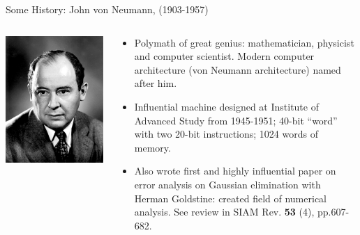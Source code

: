 \documentclass[aspectratio=169]{beamer}
\newcommand{\mypause}{\pause}
\newcommand{\cramplist}{
	\setlength{\itemsep}{0in}
	\setlength{\partopsep}{0in}
	\setlength{\topsep}{0in}}
\begin{document}
\begin{frame}{Some History: John von Neumann, (1903-1957)}
  \begin{columns}
    
    \begin{column}{0.4\linewidth}
      \includegraphics[width=\linewidth]{JohnvonNeumann-LosAlamos.png}
    \end{column}

    \begin{column}{0.6\linewidth}
      \begin{itemize}\cramplist
      \item Polymath of great genius: mathematician, physicist and
        computer scientist. Modern computer architecture (von Neumann
        architecture) named after him.%
        \mypause%
      \item Influential machine designed at Institute of Advanced
        Study from 1945-1951; 40-bit ``word'' with two 20-bit
        instructions; 1024 words of memory.
        \mypause%
      \item Also wrote first and highly influential paper on error
        analysis on Gaussian elimination with Herman Goldstine:
        created field of numerical analysis. See review in SIAM Rev.
        {\bf 53} (4), pp.607-682.
      \end{itemize}
    \end{column}
  \end{columns}
\end{frame}
\end{document}
